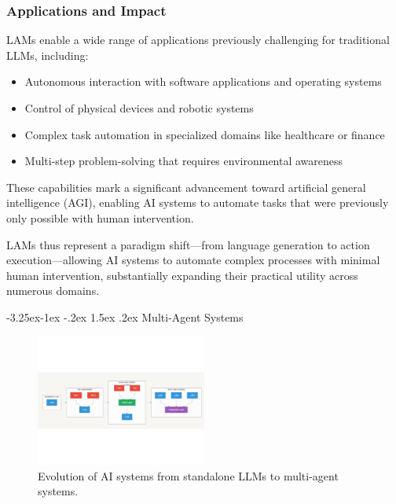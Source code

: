 \documentclass[journal,twoside,10pt]{IEEEtran}
\makeatletter
\renewcommand\subsection{\@startsection{subsection}{2}{\z@}%
                       {-3.25ex\@plus -1ex \@minus -.2ex}%
                       {1.5ex \@plus .2ex}%
                       {\normalfont\large\bfseries}}
\makeatother
\begin{document}
\subsubsection{Applications and Impact}
LAMs enable a wide range of applications previously challenging for traditional LLMs, including:

\begin{itemize}
    \item Autonomous interaction with software applications and operating systems
    \item Control of physical devices and robotic systems
    \item Complex task automation in specialized domains like healthcare or finance
    \item Multi-step problem-solving that requires environmental awareness
\end{itemize}

These capabilities mark a significant advancement toward artificial general intelligence (AGI), enabling AI systems to automate tasks that were previously only possible with human intervention.

LAMs thus represent a paradigm shift—from language generation to action execution—allowing AI systems to automate complex processes with minimal human intervention, substantially expanding their practical utility across numerous domains.

\subsection{Multi-Agent Systems}

\begin{figure}[htbp]
    \centering
    \includegraphics[width=0.5\textwidth, trim=0 150pt 0 150pt, clip]{lams_diagram.pdf}
    \caption{Evolution of AI systems from standalone LLMs to multi-agent systems.}
    \label{fig:lam-evolution}
\end{figure}
\end{document}
